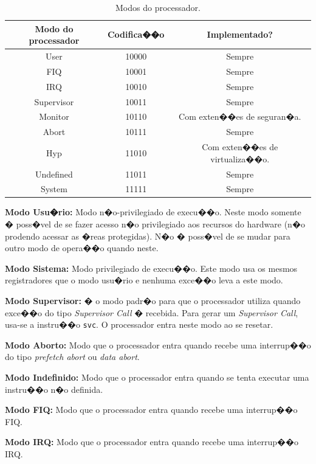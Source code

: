 \documentclass{ufscThesis/ufscThesis} %
\begin{document}
\begin{table}[ht]
\centering
\begin{tabular}{ccc}
\hline\hline                        %
Modo do processador  & Codifica��o & Implementado?\\ [0.5ex] %
\hline                  %
User & 10000 & Sempre \\
FIQ & 10001 & Sempre \\
IRQ & 10010 & Sempre \\
Supervisor & 10011 & Sempre\\
Monitor & 10110 & Com exten��es de seguran�a.\\
Abort & 10111 & Sempre\\
Hyp & 11010 & Com exten��es de virtualiza��o.\\
Undefined & 11011 & Sempre\\
System & 11111 & Sempre\\[1ex]
\hline %
\end{tabular}
\caption{Modos do processador.}
\label{tab.processormode} %
\end{table}

\textbf{Modo Usu�rio:} Modo n�o-privilegiado de execu��o. Neste modo somente � poss�vel de se fazer acesso n�o privilegiado aos recursos do hardware (n�o prodendo acessar as �reas protegidas). N�o � poss�vel de se mudar para outro modo de opera��o quando neste.

\textbf{Modo Sistema:} Modo privilegiado de execu��o. Este modo usa os mesmos registradores que o modo usu�rio e nenhuma exce��o leva a este modo.

\textbf{Modo Supervisor:} � o modo padr�o para que o processador utiliza quando exce��o do tipo \emph{Supervisor Call} � recebida.
Para gerar um \emph{Supervisor Call}, usa-se a instru��o \verb+svc+. O processador entra neste modo ao se resetar.

\textbf{Modo Aborto:} Modo que o processador entra quando recebe uma interrup��o do tipo \emph{prefetch abort} ou \emph{data abort}.

\textbf{Modo Indefinido:} Modo que o processador entra quando se tenta executar uma instru��o n�o definida.

\textbf{Modo FIQ:} Modo que o processador entra quando recebe uma interrup��o FIQ.

\textbf{Modo IRQ:} Modo que o processador entra quando recebe uma interrup��o IRQ.
\end{document}
